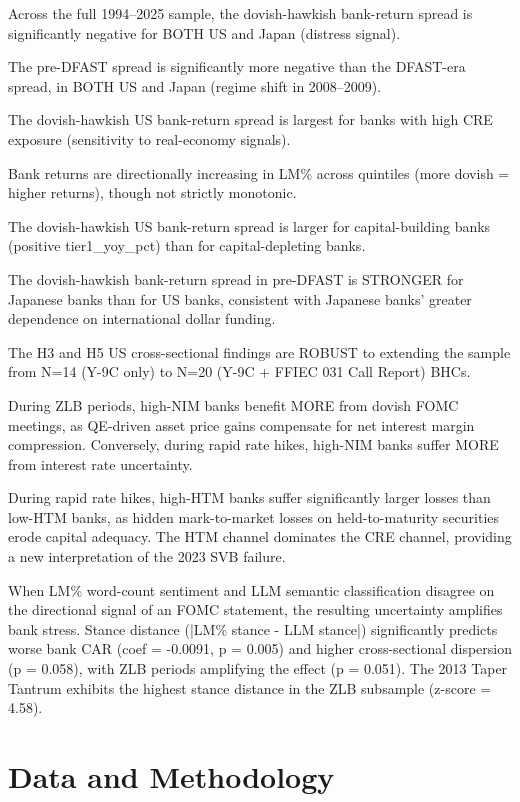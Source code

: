 \documentclass[12pt,a4paper]{article}
\begin{document}
Across the full 1994–2025 sample, the dovish-hawkish bank-return spread is significantly negative for BOTH US and Japan (distress signal).

The pre-DFAST spread is significantly more negative than the DFAST-era spread, in BOTH US and Japan (regime shift in 2008–2009).

The dovish-hawkish US bank-return spread is largest for banks with high CRE exposure (sensitivity to real-economy signals).

Bank returns are directionally increasing in LM\% across quintiles (more dovish = higher returns), though not strictly monotonic.

The dovish-hawkish US bank-return spread is larger for capital-building banks (positive tier1\_yoy\_pct) than for capital-depleting banks.

The dovish-hawkish bank-return spread in pre-DFAST is STRONGER for Japanese banks than for US banks, consistent with Japanese banks' greater dependence on international dollar funding.

The H3 and H5 US cross-sectional findings are ROBUST to extending the sample from N=14 (Y-9C only) to N=20 (Y-9C + FFIEC 031 Call Report) BHCs.

During ZLB periods, high-NIM banks benefit MORE from dovish FOMC meetings, as QE-driven asset price gains compensate for net interest margin compression. Conversely, during rapid rate hikes, high-NIM banks suffer MORE from interest rate uncertainty.

During rapid rate hikes, high-HTM banks suffer significantly larger losses than low-HTM banks, as hidden mark-to-market losses on held-to-maturity securities erode capital adequacy. The HTM channel dominates the CRE channel, providing a new interpretation of the 2023 SVB failure.

When LM\% word-count sentiment and LLM semantic classification disagree on the directional signal of an FOMC statement, the resulting uncertainty amplifies bank stress. Stance distance (|LM\% stance - LLM stance|) significantly predicts worse bank CAR (coef = -0.0091, p = 0.005) and higher cross-sectional dispersion (p = 0.058), with ZLB periods amplifying the effect (p = 0.051). The 2013 Taper Tantrum exhibits the highest stance distance in the ZLB subsample (z-score = 4.58).

\section{Data and Methodology}
\end{document}
